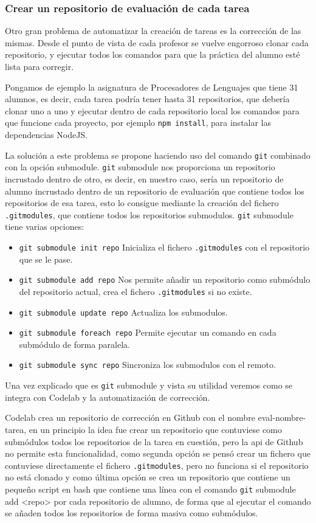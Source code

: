 \subsubsection{Crear un repositorio de evaluación de cada tarea}

Otro gran problema de automatizar la creación de tareas es la corrección de las mismas. Desde el punto de vista de cada profesor se vuelve engorroso clonar cada repositorio, y ejecutar todos los comandos para que la práctica del alumno esté lista para corregir.

Pongamos de ejemplo la asignatura de Procesadores de Lenguajes que tiene 31 alumnos, es decir, cada tarea podría tener hasta 31 repositorios, que debería clonar uno a uno y ejecutar dentro de cada repositorio local los comandos para que funcione cada proyecto, por ejemplo \verb|npm install|, para instalar las dependencias NodeJS.

La solución a este problema se propone haciendo uso del comando \verb|git| combinado con la opción submodule. \verb|git| submodule nos proporciona un repositorio incrustado dentro de otro, es decir, en nuestro caso, sería un repositorio de alumno incrustado dentro de un repositorio de evaluación que contiene todos los repositorios de esa tarea, esto lo consigue mediante la creación del fichero \verb|.gitmodules|, que contiene todos los repositorios submodulos. \verb|git| submodule tiene varias opciones: 

\begin{itemize}
\item \verb|git submodule init repo| Inicializa el fichero \verb|.gitmodules| con el repositorio que se le pase.
\item \verb|git submodule add repo| Nos permite añadir un repositorio como submódulo del repositorio actual, crea el fichero \verb|.gitmodules| si no existe.
\item \verb|git submodule update repo| Actualiza los submodulos.
\item \verb|git submodule foreach repo| Permite ejecutar un comando en cada submódulo de forma paralela.
\item \verb|git submodule sync repo| Sincroniza los submodulos con el remoto.
\end{itemize}

Una vez explicado que es \verb|git| submodule y vista su utilidad veremos como se integra con Codelab y la automatización de corrección. 

Codelab crea un repositorio de corrección en Github con el nombre eval-nombre-tarea, en un principio la idea fue crear un repositorio que contuviese como submódulos todos los repositorios de la tarea en cuestión, pero la api de Github no permite esta funcionalidad, como segunda opción se pensó crear un fichero que contuviese directamente el fichero \verb|.gitmodules|, pero no funciona si el repositorio no está clonado y como última opción se crea un repositorio que contiene un pequeño script en bash que contiene una línea con el comando \verb|git| submodule add <repo> por cada repositorio de alumno, de forma que al ejecutar el comando se añaden todos los repositorios de forma masiva como submódulos.

